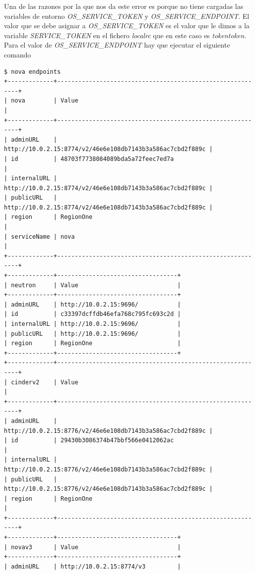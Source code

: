 \documentclass{article}
\begin{document}
	Una de las razones por la que nos da este error es porque no tiene cargadas las variables de entorno \emph{OS\_SERVICE\_TOKEN} y \emph{OS\_SERVICE\_ENDPOINT}. El valor que se debe asignar a \emph{OS\_SERVICE\_TOKEN} es el valor que le dimos a la variable \emph{SERVICE\_TOKEN} en el fichero \emph{localrc} que en este caso es \emph{tokentoken}. Para el valor de \emph{OS\_SERVICE\_ENDPOINT} hay que ejecutar el siguiente comando\cite{KeystoneCLI}
\begin{lstlisting}[style=miniBash]
$ nova endpoints
+-------------+-----------------------------------------------------------+
| nova        | Value                                                     |
+-------------+-----------------------------------------------------------+
| adminURL    | http://10.0.2.15:8774/v2/46e6e108db7143b3a586ac7cbd2f889c |
| id          | 48703f7738084089bda5a72feec7ed7a                          |
| internalURL | http://10.0.2.15:8774/v2/46e6e108db7143b3a586ac7cbd2f889c |
| publicURL   | http://10.0.2.15:8774/v2/46e6e108db7143b3a586ac7cbd2f889c |
| region      | RegionOne                                                 |
| serviceName | nova                                                      |
+-------------+-----------------------------------------------------------+
+-------------+----------------------------------+
| neutron     | Value                            |
+-------------+----------------------------------+
| adminURL    | http://10.0.2.15:9696/           |
| id          | c33397dcffdb46efa768c795fc693c2d |
| internalURL | http://10.0.2.15:9696/           |
| publicURL   | http://10.0.2.15:9696/           |
| region      | RegionOne                        |
+-------------+----------------------------------+
+-------------+-----------------------------------------------------------+
| cinderv2    | Value                                                     |
+-------------+-----------------------------------------------------------+
| adminURL    | http://10.0.2.15:8776/v2/46e6e108db7143b3a586ac7cbd2f889c |
| id          | 29430b3086374b47bbf566e0412062ac                          |
| internalURL | http://10.0.2.15:8776/v2/46e6e108db7143b3a586ac7cbd2f889c |
| publicURL   | http://10.0.2.15:8776/v2/46e6e108db7143b3a586ac7cbd2f889c |
| region      | RegionOne                                                 |
+-------------+-----------------------------------------------------------+
+-------------+----------------------------------+
| novav3      | Value                            |
+-------------+----------------------------------+
| adminURL    | http://10.0.2.15:8774/v3         |

\end{lstlisting}
\end{document}
